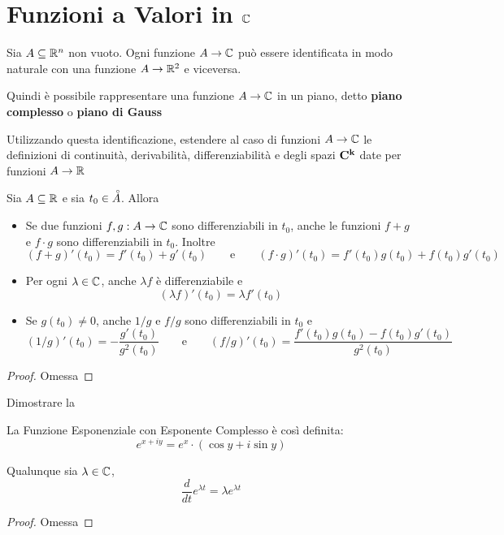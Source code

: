 \newpage
\section{Funzioni a Valori in \texorpdfstring{$\protect\mathbb{C}$}{C}}\label{sect:fun_in_C}
Sia $A \subseteq \mathbb{R}^n$ non vuoto. Ogni funzione $A \to \mathbb{C}$ può essere identificata in modo naturale con una funzione $A \to \mathbb{R}^2$ e viceversa.
\begin{note}
	Quindi è possibile rappresentare una funzione $A \to \mathbb{C}$ in un piano, detto \textbf{piano complesso} o \textbf{piano di Gauss}
\end{note}
\begin{exercise}
	\label{ex:ext_def_in_C}
	Utilizzando questa identificazione, estendere al caso di funzioni $A \to \mathbb{C}$ le definizioni di continuità, derivabilità, differenziabilità e degli spazi $\mathbf{C^{k}}$ date per funzioni $A \to \mathbb{R}$
\end{exercise}
\begin{proposition}
	\label{prop:fg_in_C}
	Sia $A \subseteq \mathbb{R}$ e sia $t_0 \in \accentset{\circ}{A}$. Allora
	\begin{itemize}
		\item Se due funzioni $f,g: A \to \mathbb{C}$ sono differenziabili in $t_0$, anche le funzioni $f+g$ e $f \cdot g$ sono differenziabili in $t_0$. Inoltre
			\[(f+g)'(t_0) = f'(t_0) + g'(t_0) \qquad\text{e}\qquad (f \cdot g)'(t_0) = f'(t_0)g(t_0)+f(t_0)g'(t_0)\]
		\item Per ogni $\lambda \in \mathbb{C}$, anche $\lambda f$ è differenziabile e
			\[(\lambda f)'(t_0) = \lambda f'(t_0)\]
		\item Se $g(t_0) \neq 0$, anche $1/g$ e $f/g$ sono differenziabili in $t_0$ e
			\[(1/g)'(t_0) = - \frac{g'(t_0)}{g^2(t_0)} \qquad\text{e}\qquad (f/g)'(t_0) = \frac{f'(t_0)g(t_0)-f(t_0)g'(t_0)}{g^2(t_0)}\]
	\end{itemize}
	\begin{proof}
		Omessa
	\end{proof}
\end{proposition}
\begin{exercise}
	Dimostrare la 
\end{exercise}
\begin{definition}
	\label{def:exp_complesso}
	La Funzione Esponenziale con Esponente Complesso è così definita:
	\[e^{x+iy} = e^x \cdot (\cos y + i \sin y)\]
\end{definition}
\begin{proposition}
	\label{prop:deriv_exp_in_C}
	Qualunque sia $\lambda \in \mathbb{C}$,
	\[\frac{d}{dt}e^{\lambda t} = \lambda e^{\lambda t}\]
	\begin{proof}
		Omessa
	\end{proof}
\end{proposition}
